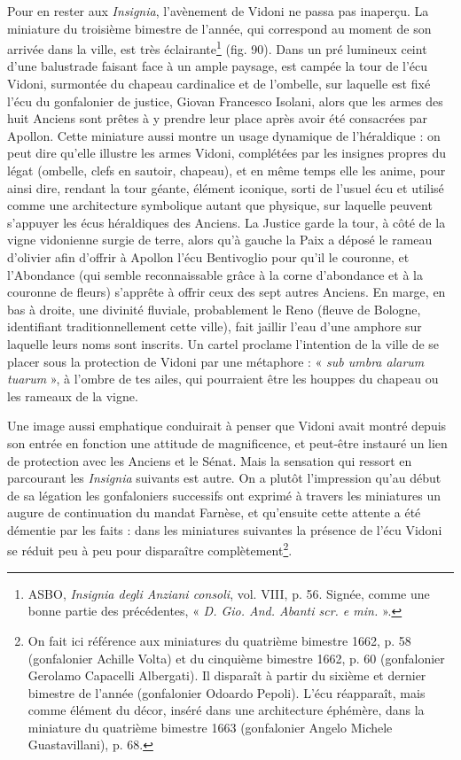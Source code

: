 \documentclass[12pt,twoside,openany]{book}
\begin{document}
Pour en rester aux \textit{Insignia}, l’avènement de Vidoni ne passa pas inaperçu. La miniature du troisième bimestre de l’année, qui correspond au moment de son arrivée dans la ville, est très éclairante\footnote{ASBO, \textit{Insignia degli Anziani consoli}, vol. VIII, p. 56. Signée, comme une bonne partie des précédentes, « \textit{D. Gio. And. Abanti scr. e min. }».} (fig. 90). Dans un pré lumineux ceint d’une balustrade faisant face à un ample paysage, est campée la tour de l’écu Vidoni, surmontée du chapeau cardinalice et de l’ombelle, sur laquelle est fixé l’écu du gonfalonier de justice, Giovan Francesco Isolani, alors que les armes des huit Anciens sont prêtes à y prendre leur place après avoir été consacrées par Apollon. Cette miniature aussi montre un usage dynamique de l’héraldique : on peut dire qu’elle illustre les armes Vidoni, complétées par les insignes propres du légat (ombelle, clefs en sautoir, chapeau), et en même temps elle les anime, pour ainsi dire, rendant la tour géante, élément iconique, sorti de l’usuel écu et utilisé comme une architecture symbolique autant que physique, sur laquelle peuvent s’appuyer les écus héraldiques des Anciens. La Justice garde la tour, à côté de la vigne vidonienne surgie de terre, alors qu’à gauche la Paix a déposé le rameau d’olivier afin d’offrir à Apollon l’écu Bentivoglio pour qu’il le couronne, et l’Abondance (qui semble reconnaissable grâce à la corne d’abondance et à la couronne de fleurs) s’apprête à offrir ceux des sept autres Anciens. En marge, en bas à droite, une divinité fluviale, probablement le Reno (fleuve de Bologne, identifiant traditionnellement cette ville), fait jaillir l’eau d’une amphore sur laquelle leurs noms sont inscrits. Un cartel proclame l’intention de la ville de se placer sous la protection de Vidoni par une métaphore : « \textit{sub umbra alarum tuarum }», à l’ombre de tes ailes, qui pourraient être les houppes du chapeau ou les rameaux de la vigne.

Une image aussi emphatique conduirait à penser que Vidoni avait montré depuis son entrée en fonction une attitude de magnificence, et peut-être instauré un lien de protection avec les Anciens et le Sénat. Mais la sensation qui ressort en parcourant les \textit{Insignia }suivants est autre. On a plutôt l’impression qu’au début de sa légation les gonfaloniers successifs ont exprimé à travers les miniatures un augure de continuation du mandat Farnèse, et qu’ensuite cette attente a été démentie par les faits : dans les miniatures suivantes la présence de l’écu Vidoni se réduit peu à peu pour disparaître complètement\footnote{On fait ici référence aux miniatures du quatrième bimestre 1662, p. 58 (gonfalonier Achille Volta) et du cinquième bimestre 1662, p. 60 (gonfalonier Gerolamo Capacelli Albergati). Il disparaît à partir du sixième et dernier bimestre de l’année (gonfalonier Odoardo Pepoli). L’écu réapparaît, mais comme élément du décor, inséré dans une architecture éphémère, dans la miniature du quatrième bimestre 1663 (gonfalonier Angelo Michele Guastavillani), p. 68.}.
\end{document}
